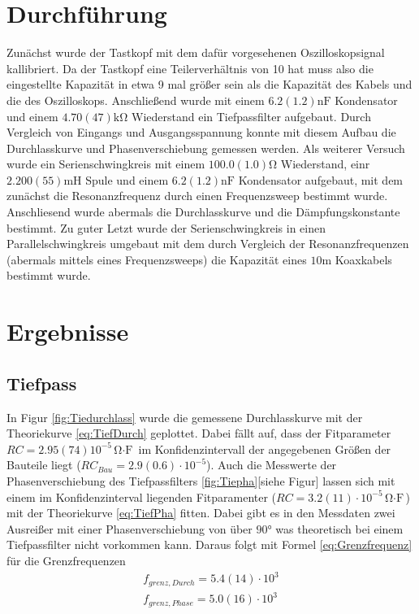 \documentclass[11pt, a4paper]{article}
\begin{document}
    \section{Durchführung}
    Zunächst wurde der Tastkopf mit dem dafür vorgesehenen Oszilloskopsignal kallibriert. Da der Tastkopf eine Teilerverhältnis von 10 hat muss also die
    eingestellte Kapazität in etwa 9 mal größer sein als die Kapazität des Kabels und die des Oszilloskops. 
    Anschließend wurde mit einem $6.2(1.2) \si{\nano\farad}$ Kondensator und einem $4.70(47) \si{\kilo\ohm}$ Wiederstand ein Tiefpassfilter aufgebaut. 
    Durch Vergleich von Eingangs und Ausgangsspannung konnte mit diesem Aufbau die Durchlasskurve und Phasenverschiebung gemessen werden.
    Als weiterer Versuch wurde ein Serienschwingkreis mit einem $100.0(1.0) \si{\ohm}$ Wiederstand, einr $2.200(55) \si{\milli\henry}$ Spule und einem $6.2(1.2) \si{\nano\farad}$ Kondensator aufgebaut, mit dem zunächst die Resonanzfrequenz durch einen Frequenzsweep bestimmt wurde.
    Anschliesend wurde abermals die Durchlasskurve und die Dämpfungskonstante bestimmt.
    Zu guter Letzt wurde der Serienschwingkreis in einen Parallelschwingkreis umgebaut mit dem durch Vergleich der Resonanzfrequenzen (abermals mittels eines Frequenzsweeps) die Kapazität eines $10 \si{\metre}$ Koaxkabels bestimmt wurde.

    \section{Ergebnisse}
    \subsection{Tiefpass}
    In Figur \ref{fig:Tiedurchlass} wurde die gemessene Durchlasskurve mit der Theoriekurve \ref{eq:TiefDurch} geplottet. 
    Dabei fällt auf, dass der Fitparameter $RC = 2.95(74) 10^{-5} \si{\ohm\cdot\farad}$ im Konfidenzintervall der angegebenen Größen der Bauteile liegt ($RC_{Bau} = 2.9(0.6)\cdot 10^{-5}$).
    Auch die Messwerte der Phasenverschiebung des Tiefpassfilters \ref{fig:Tiepha}[siehe Figur] lassen sich mit einem im Konfidenzinterval liegenden Fitparamenter ($RC = 3.2(11) \cdot 10^{-5} \si{\ohm\cdot\farad}$) mit der Theoriekurve \ref{eq:TiefPha} fitten.
    Dabei gibt es in den Messdaten zwei Ausreißer mit einer Phasenverschiebung von über $90$° was theoretisch bei einem Tiefpassfilter nicht vorkommen kann.
    Daraus folgt mit Formel \ref{eq:Grenzfrequenz} für die Grenzfrequenzen
    \begin{align}
        f_{grenz,Durch} = 5.4(14) \cdot 10^{3} \\
        f_{grenz,Phase} = 5.0(16) \cdot 10^{3}

    \end{align}
\end{document}
